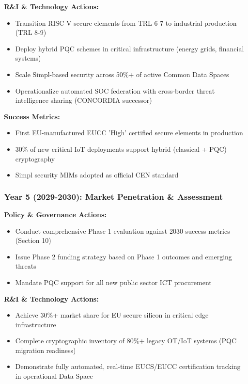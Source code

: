 \documentclass[12pt,a4paper]{article}
\begin{document}
\textbf{R\&I \& Technology Actions:}
\begin{itemize}
    \item Transition RISC-V secure elements from TRL 6-7 to industrial production (TRL 8-9)
    \item Deploy hybrid PQC schemes in critical infrastructure (energy grids, financial systems)
    \item Scale Simpl-based security across 50\%+ of active Common Data Spaces
    \item Operationalize automated SOC federation with cross-border threat intelligence sharing (CONCORDIA successor)
\end{itemize}

\textbf{Success Metrics:}
\begin{itemize}
    \item First EU-manufactured EUCC 'High' certified secure elements in production
    \item 30\% of new critical IoT deployments support hybrid (classical + PQC) cryptography
    \item Simpl security MIMs adopted as official CEN standard
\end{itemize}

\subsubsection*{Year 5 (2029-2030): Market Penetration \& Assessment}
\textbf{Policy \& Governance Actions:}
\begin{itemize}
    \item Conduct comprehensive Phase 1 evaluation against 2030 success metrics (Section 10)
    \item Issue Phase 2 funding strategy based on Phase 1 outcomes and emerging threats
    \item Mandate PQC support for all new public sector ICT procurement
\end{itemize}

\textbf{R\&I \& Technology Actions:}
\begin{itemize}
    \item Achieve 30\%+ market share for EU secure silicon in critical edge infrastructure
    \item Complete cryptographic inventory of 80\%+ legacy OT/IoT systems (PQC migration readiness)
    \item Demonstrate fully automated, real-time EUCS/EUCC certification tracking in operational Data Space
\end{itemize}
\end{document}
